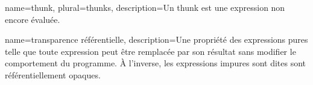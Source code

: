  {
	name=thunk,
	plural=thunks,
	description={Un thunk est une expression non encore évaluée. }
}

 {
	name={transparence référentielle},
	description={Une propriété des expressions pures telle que toute expression peut être remplacée par son résultat sans modifier le comportement du programme. À l'inverse, les expressions impures sont dites sont référentiellement opaques.}
}
